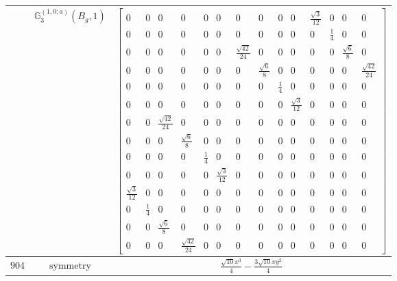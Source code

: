 \documentclass[fleqn,8pt,landscape]{jsarticle}
\begin{document}
\begin{longtable}{ccc}
$  $ & $ \mathbb{G}_{3}^{(1,0;a)}(B_{g},1) $ & $ \begin{bmatrix} 0 & 0 & 0 & 0 & 0 & 0 & 0 & 0 & 0 & 0 & \frac{\sqrt{3}}{12} & 0 & 0 & 0 \\ 0 & 0 & 0 & 0 & 0 & 0 & 0 & 0 & 0 & 0 & 0 & \frac{1}{4} & 0 & 0 \\ 0 & 0 & 0 & 0 & 0 & 0 & \frac{\sqrt{42}}{24} & 0 & 0 & 0 & 0 & 0 & \frac{\sqrt{6}}{8} & 0 \\ 0 & 0 & 0 & 0 & 0 & 0 & 0 & \frac{\sqrt{6}}{8} & 0 & 0 & 0 & 0 & 0 & \frac{\sqrt{42}}{24} \\ 0 & 0 & 0 & 0 & 0 & 0 & 0 & 0 & \frac{1}{4} & 0 & 0 & 0 & 0 & 0 \\ 0 & 0 & 0 & 0 & 0 & 0 & 0 & 0 & 0 & \frac{\sqrt{3}}{12} & 0 & 0 & 0 & 0 \\ 0 & 0 & \frac{\sqrt{42}}{24} & 0 & 0 & 0 & 0 & 0 & 0 & 0 & 0 & 0 & 0 & 0 \\ 0 & 0 & 0 & \frac{\sqrt{6}}{8} & 0 & 0 & 0 & 0 & 0 & 0 & 0 & 0 & 0 & 0 \\ 0 & 0 & 0 & 0 & \frac{1}{4} & 0 & 0 & 0 & 0 & 0 & 0 & 0 & 0 & 0 \\ 0 & 0 & 0 & 0 & 0 & \frac{\sqrt{3}}{12} & 0 & 0 & 0 & 0 & 0 & 0 & 0 & 0 \\ \frac{\sqrt{3}}{12} & 0 & 0 & 0 & 0 & 0 & 0 & 0 & 0 & 0 & 0 & 0 & 0 & 0 \\ 0 & \frac{1}{4} & 0 & 0 & 0 & 0 & 0 & 0 & 0 & 0 & 0 & 0 & 0 & 0 \\ 0 & 0 & \frac{\sqrt{6}}{8} & 0 & 0 & 0 & 0 & 0 & 0 & 0 & 0 & 0 & 0 & 0 \\ 0 & 0 & 0 & \frac{\sqrt{42}}{24} & 0 & 0 & 0 & 0 & 0 & 0 & 0 & 0 & 0 & 0 \end{bmatrix} $ \\ \hline
$ 904 $ & $ \text{symmetry} $ & $ \frac{\sqrt{10} x^{3}}{4} - \frac{3 \sqrt{10} x y^{2}}{4} $ \\

\end{longtable}
\end{document}
